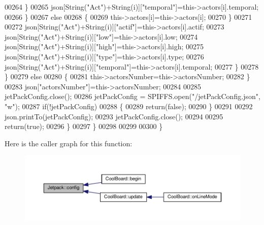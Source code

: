 \begin{DoxyCode}
00264                         \}   
00265                         json[String(\textcolor{stringliteral}{"Act"})+String(i)][\textcolor{stringliteral}{"temporal"}]=this->actors[i].temporal; 
00266                     \}
00267                     \textcolor{keywordflow}{else}
00268                     \{
00269                         this->actors[i]=this->actors[i];
00270                     \}
00271                     
00272                     json[String(\textcolor{stringliteral}{"Act"})+String(i)][\textcolor{stringliteral}{"actif"}]=this->actors[i].actif;
00273                     json[String(\textcolor{stringliteral}{"Act"})+String(i)][\textcolor{stringliteral}{"low"}]=this->actors[i].low;
00274                     json[String(\textcolor{stringliteral}{"Act"})+String(i)][\textcolor{stringliteral}{"high"}]=this->actors[i].high;
00275                     json[String(\textcolor{stringliteral}{"Act"})+String(i)][\textcolor{stringliteral}{"type"}]=this->actors[i].type;
00276                     json[String(\textcolor{stringliteral}{"Act"})+String(i)][\textcolor{stringliteral}{"temporal"}]=this->actors[i].temporal; 
00277                 \}
00278             \}
00279             \textcolor{keywordflow}{else}
00280             \{
00281                 this->actorsNumber=this->actorsNumber;
00282             \}
00283             json[\textcolor{stringliteral}{"actorsNumber"}]=this->actorsNumber;
00284 
00285             jetPackConfig.close();          
00286             jetPackConfig = SPIFFS.open(\textcolor{stringliteral}{"/jetPackConfig.json"}, \textcolor{stringliteral}{"w"});            
00287             \textcolor{keywordflow}{if}(!jetPackConfig)
00288             \{
00289                 \textcolor{keywordflow}{return}(\textcolor{keyword}{false});          
00290             \}  
00291 
00292             json.printTo(jetPackConfig);
00293             jetPackConfig.close();      
00294             
00295             \textcolor{keywordflow}{return}(\textcolor{keyword}{true}); 
00296         \}
00297     \}   
00298     
00299 
00300 \}
\end{DoxyCode}
Here is the caller graph for this function\+:\nopagebreak
\begin{figure}[H]
\begin{center}
\leavevmode
\includegraphics[width=350pt]{class_jetpack_ab065ee83e244265a2223a22f3ee4a719_icgraph}
\end{center}
\end{figure}
\mbox{\label{class_jetpack_a86d2e83436ef4b85f4c3a6e85ac785b0}} 
